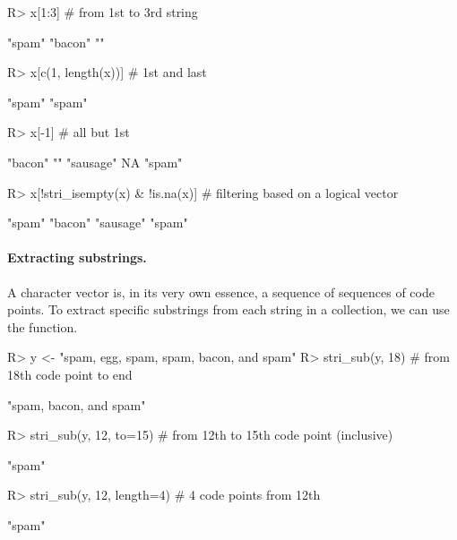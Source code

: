 \documentclass[nojss]{jss}
\begin{document}
\begin{Schunk}
\begin{Sinput}
R> x[1:3] # from 1st to 3rd string
\end{Sinput}
\begin{Soutput}
[1] "spam"  "bacon" ""
\end{Soutput}
\begin{Sinput}
R> x[c(1, length(x))] # 1st and last
\end{Sinput}
\begin{Soutput}
[1] "spam" "spam"
\end{Soutput}
\begin{Sinput}
R> x[-1]  # all but 1st
\end{Sinput}
\begin{Soutput}
[1] "bacon"   ""        "sausage" NA        "spam"
\end{Soutput}
\begin{Sinput}
R> x[!stri_isempty(x) & !is.na(x)] # filtering based on a logical vector
\end{Sinput}
\begin{Soutput}
[1] "spam"    "bacon"   "sausage" "spam"
\end{Soutput}
\end{Schunk}

\paragraph{Extracting substrings.}
A character vector is, in its very own essence, a sequence of
sequences of code points.
To extract specific substrings from each string in a collection,
we can use the  function.

\begin{Schunk}
\begin{Sinput}
R> y <- "spam, egg, spam, spam, bacon, and spam"
R> stri_sub(y, 18)           # from 18th code point to end
\end{Sinput}
\begin{Soutput}
[1] "spam, bacon, and spam"
\end{Soutput}
\begin{Sinput}
R> stri_sub(y, 12, to=15)    # from 12th to 15th code point  (inclusive)
\end{Sinput}
\begin{Soutput}
[1] "spam"
\end{Soutput}
\begin{Sinput}
R> stri_sub(y, 12, length=4) # 4 code points from 12th
\end{Sinput}
\begin{Soutput}
[1] "spam"
\end{Soutput}
\end{Schunk}
\end{document}
